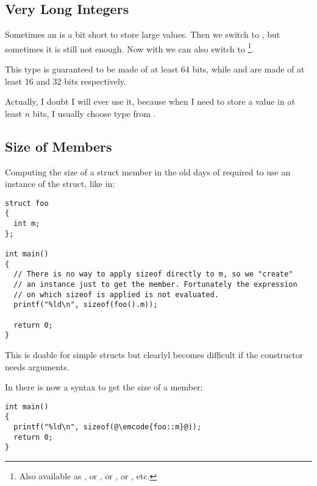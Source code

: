 \subsection{Very Long Integers}

Sometimes an  is a bit short to store large values. Then we
switch to , but sometimes it is still not enough. Now
with  we can also switch to \footnote{Also
available as , or ,
or , or , etc.}.

This type is guaranteed to be made of at least 64 bits,
while  and  are made of at least 16 and 32
bits respectively.

Actually, I doubt I will ever use it, because when I need to store a
value in at least $n$ bits, I usually choose  type
from .

\subsection{Size of Members}

Computing the size of a struct member in the old days of \cpp{}
required to use an instance of the struct, like in:

\begin{lstlisting}
struct foo
{
  int m;
};

int main()
{
  // There is no way to apply sizeof directly to m, so we "create"
  // an instance just to get the member. Fortunately the expression
  // on which sizeof is applied is not evaluated.
  printf("%ld\n", sizeof(foo().m));

  return 0;
}
\end{lstlisting}

This is doable for simple structs but clearlyl becomes difficult if
the constructor needs arguments.

In  there is now a syntax to get the size of a member:

\begin{lstlisting}
int main()
{
  printf("%ld\n", sizeof(@\emcode{foo::m}@));
  return 0;
}
\end{lstlisting}

